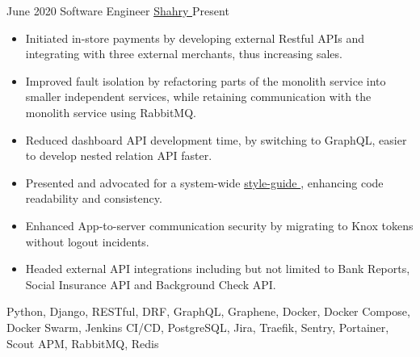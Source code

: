 %
%
%


\begin{experiences}
    \experience
        {June 2020}
        {Software Engineer}
        {\href{https://shahry.app/en/}{Shahry \faExternalLink}}
        {Present}
        {
            \begin{itemize}
                \item Initiated in-store payments by developing external Restful APIs and
                integrating with three external merchants, thus increasing sales.
                \item Improved fault isolation by refactoring parts of the monolith service into smaller independent services, while retaining communication with the monolith service using RabbitMQ.
                \item Reduced dashboard API development time, by switching to GraphQL, easier to develop nested relation API faster.
                \item Presented and advocated for a system-wide \href{https://github.com/HackSoftware/Django-Styleguide}{style-guide \faExternalLink}, enhancing code readability and consistency.
                \item Enhanced App-to-server communication security by migrating to Knox tokens without logout incidents.
                \item Headed external API integrations including but not limited to Bank Reports, Social Insurance API and Background Check API.
            \end{itemize}
        }
        {
            Python,
            Django,
            RESTful,
            DRF,
            GraphQL,
            Graphene,
            Docker,
            Docker Compose,
            Docker Swarm,
            Jenkins CI/CD,
            PostgreSQL,
            Jira,
            Traefik,
            Sentry,
            Portainer,
            Scout APM,
            RabbitMQ,
            Redis
        }
    \emptySeparator


\end{experiences}

